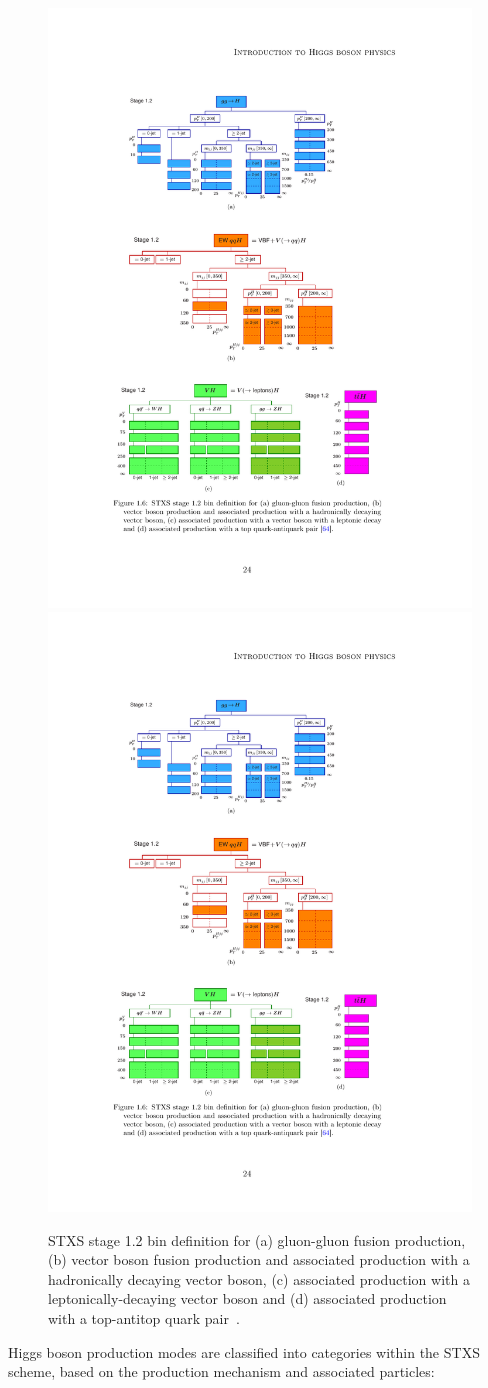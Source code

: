 \begin{figure}[htbp]
    \includegraphics[width=0.6\linewidth]{images/STXSbins_VlepH}\\
    \includegraphics[width=0.25\linewidth]{images/STXSbins_ttH}\\
    \caption{STXS stage 1.2 bin definition for (a) gluon-gluon fusion production, (b) vector boson fusion production and associated production with a hadronically decaying vector boson, (c) associated production with a leptonically-decaying vector boson and (d) associated production with a top-antitop quark pair~\cite{badger2016leshouches2015physics}.}
    \label{fig:STXSbins}
\end{figure}


Higgs boson production modes are classified into categories within the STXS scheme, based on the production mechanism and associated particles:

